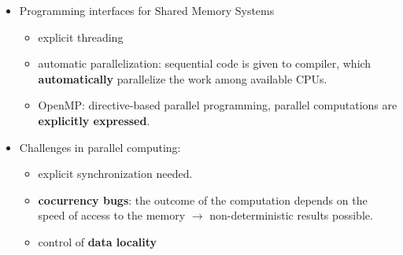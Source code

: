 \begin{itemize}
	\item Programming interfaces for Shared Memory Systems
	\begin{itemize}
		\item explicit threading
		\item automatic parallelization: sequential code is given to compiler, which \textbf{automatically} parallelize the work among available CPUs.
		\item OpenMP: directive-based parallel programming, parallel computations are \textbf{explicitly expressed}.
	\end{itemize}
	\item Challenges in parallel computing:
	\begin{itemize}
		\item explicit synchronization needed.
		\item \textbf{cocurrency bugs}: the outcome of the computation depends on the speed of access to the memory $\rightarrow$ non-deterministic results possible.
		\item control of \textbf{data locality}
	\end{itemize}
\end{itemize}


